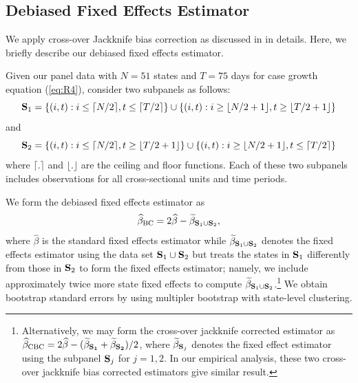 \documentclass[3p, longtitle]{elsarticle}
\theoremstyle{definition}
\begin{document}


\subsection{Debiased Fixed Effects Estimator}

We apply cross-over Jackknife bias correction as discussed in \cite{chen2020} in details. Here, we briefly describe our debiased fixed effects estimator.

Given our panel data with $N=51$ states and $T=75$ days  for case growth equation (\ref{eq:R4}), consider two subpanels as follows:
$$
{\bf S}_1 =  \{(i,t) :  i \leq \lceil N/2 \rceil,  t \leq \lceil T/2 \rceil \} \cup  \{(i,t) : i  \geq \lfloor N/2 + 1 \rfloor, t  \geq \lfloor T/2 + 1\rfloor \}
$$
and
$$
{\bf S}_2 =  \{(i,t) :  i \leq \lceil N/2 \rceil, t  \geq \lfloor T/2 + 1\rfloor \} \cup  \{(i,t) : i  \geq \lfloor N/2 + 1 \rfloor, t  \leq \lceil  T/2 \rceil \}
$$
where $\lceil . \rceil$  and  $\lfloor . \rfloor$ are the ceiling and floor functions.  Each of these two subpanels includes observations for all cross-sectional units and time periods.

We form the debiased fixed effects estimator as
$$
\widehat \beta_{\rm BC}  =  2 \widehat \beta -  \widetilde \beta_{{\bf S}_1\cup{\bf S}_2},
$$
where $\widehat \beta$ is the standard fixed effects estimator while $\widetilde \beta_{{\bf S}_1\cup{\bf S}_2}$ denotes the fixed effects estimator using the data set  ${\bf S}_1\cup{\bf S}_2$ but treats the states in  ${\bf S}_1$ differently from those in  ${\bf S}_2$ to form the fixed effects estimator; namely, we include approximately twice more state fixed effects to compute $\widetilde \beta_{{\bf S}_1\cup{\bf S}_2}$.\footnote{Alternatively, we may form the cross-over jackknife corrected estimator as $\widehat \beta_{\rm CBC}  =  2 \widehat \beta -  (\widetilde \beta_{{\bf S_1}}+\widetilde \beta_{{\bf S_2}})/2$, where $\widetilde \beta_{{\bf S}_j}$ denotes the fixed effect estimator using the subpanel  ${\bf S}_j$ for $j=1,2$. In our empirical analysis, these two cross-over jackknife bias corrected estimators give  similar result.} We obtain bootstrap standard errors by using multipler bootstrap with state-level clustering.
\end{document}
